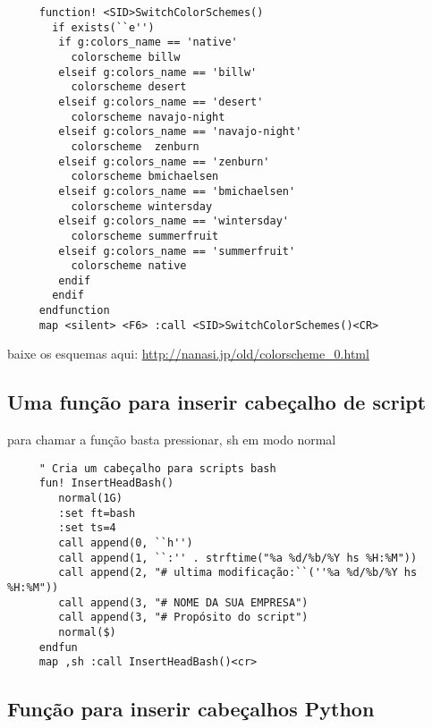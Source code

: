 \begin{verbatim}
     function! <SID>SwitchColorSchemes()
       if exists(``e'')
        if g:colors_name == 'native'
          colorscheme billw
        elseif g:colors_name == 'billw'
          colorscheme desert
        elseif g:colors_name == 'desert'
          colorscheme navajo-night
        elseif g:colors_name == 'navajo-night'
          colorscheme  zenburn
        elseif g:colors_name == 'zenburn'
          colorscheme bmichaelsen
        elseif g:colors_name == 'bmichaelsen'
          colorscheme wintersday
        elseif g:colors_name == 'wintersday'
          colorscheme summerfruit
        elseif g:colors_name == 'summerfruit'
          colorscheme native
        endif
       endif
     endfunction
     map <silent> <F6> :call <SID>SwitchColorSchemes()<CR>
\end{verbatim}

baixe os esquemas aqui:
\url{http://nanasi.jp/old/colorscheme_0.html}

\subsection{Uma função para inserir cabeçalho de script}
\label{Uma função para inserir cabeçalho de script bash}
para chamar a função
basta pressionar, sh em modo normal

\begin{verbatim}
     " Cria um cabeçalho para scripts bash
     fun! InsertHeadBash()
        normal(1G)
        :set ft=bash
        :set ts=4
        call append(0, ``h'')
        call append(1, ``:'' . strftime("%a %d/%b/%Y hs %H:%M"))
        call append(2, "# ultima modificação:``(''%a %d/%b/%Y hs %H:%M"))
        call append(3, "# NOME DA SUA EMPRESA")
        call append(3, "# Propósito do script")
        normal($)
     endfun
     map ,sh :call InsertHeadBash()<cr>
\end{verbatim}

\subsection{Função para inserir cabeçalhos Python}
\label{Função para inserir cabeçalhos Python}

